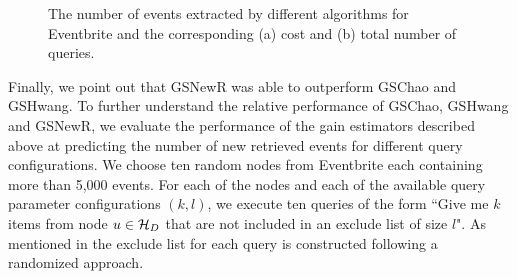 \fi
\ifpaper
\begin{figure}[h]
	\begin{center}
	\caption{The number of events extracted by different algorithms for Eventbrite and the corresponding (a) cost and (b) total number of queries.}
	\end{center}
	\vspace{-15pt}
\end{figure}
\fi

Finally, we point out that GSNewR was able to outperform GSChao and GSHwang. To further understand the relative performance of GSChao, GSHwang and GSNewR, we evaluate the performance of the gain estimators described above at predicting the number of new retrieved events for different query configurations. We choose ten random nodes from Eventbrite each containing more than 5,000 events. For each of the nodes and each of the available query parameter configurations $(k,l)$, we execute ten queries of the form ``Give me $k$ items from node $u \in \mathcal{H}_D$ that are not included in an exclude list of size $l$". As mentioned in  the exclude list for each query is constructed following a randomized approach. 

